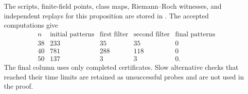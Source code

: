 The scripts, finite-field points, class maps, Riemann--Roch witnesses,
and independent replays for this proposition are stored in
. The accepted computations give
\[
\begin{array}{c|rrrr}
 n&\text{initial patterns}&\text{first filter}&\text{second filter}
       &\text{final patterns}\\\hline
38&233&35&35&0\\
40&781&288&118&0\\
50&137&3&3&0.
\end{array}
\]
The final column uses only completed certificates. Slow alternative
checks that reached their time limits are retained as unsuccessful
probes and are not used in the proof.
